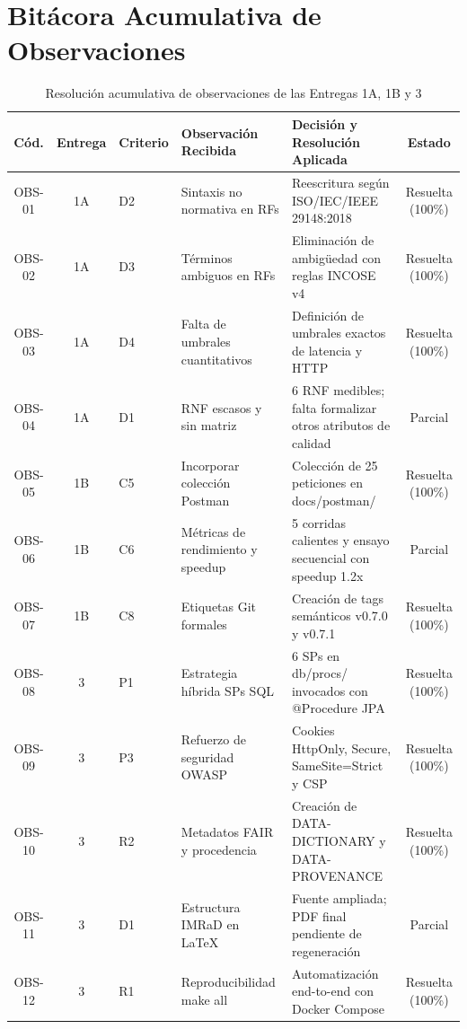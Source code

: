 \documentclass[11pt,a4paper]{report}
\begin{document}
\chapter{Bitácora Acumulativa de Observaciones}
\begin{table}[htbp]
\centering
\caption{Resolución acumulativa de observaciones de las Entregas 1A, 1B y 3}
\label{tab:anexo_observaciones}
\tiny
\begin{tabularx}{\textwidth}{ccllXc}
\toprule
\textbf{Cód.} & \textbf{Entrega} & \textbf{Criterio} & \textbf{Observación Recibida} & \textbf{Decisión y Resolución Aplicada} & \textbf{Estado} \\
\midrule
OBS-01 & 1A & D2 & Sintaxis no normativa en RFs & Reescritura según ISO/IEC/IEEE 29148:2018 & Resuelta (100\%) \\
OBS-02 & 1A & D3 & Términos ambiguos en RFs & Eliminación de ambigüedad con reglas INCOSE v4 & Resuelta (100\%) \\
OBS-03 & 1A & D4 & Falta de umbrales cuantitativos & Definición de umbrales exactos de latencia y HTTP & Resuelta (100\%) \\
OBS-04 & 1A & D1 & RNF escasos y sin matriz & 6 RNF medibles; falta formalizar otros atributos de calidad & Parcial \\
OBS-05 & 1B & C5 & Incorporar colección Postman & Colección de 25 peticiones en docs/postman/ & Resuelta (100\%) \\
OBS-06 & 1B & C6 & Métricas de rendimiento y speedup & 5 corridas calientes y ensayo secuencial con speedup 1.2x & Parcial \\
OBS-07 & 1B & C8 & Etiquetas Git formales & Creación de tags semánticos v0.7.0 y v0.7.1 & Resuelta (100\%) \\
OBS-08 & 3 & P1 & Estrategia híbrida SPs SQL & 6 SPs en db/procs/ invocados con @Procedure JPA & Resuelta (100\%) \\
OBS-09 & 3 & P3 & Refuerzo de seguridad OWASP & Cookies HttpOnly, Secure, SameSite=Strict y CSP & Resuelta (100\%) \\
OBS-10 & 3 & R2 & Metadatos FAIR y procedencia & Creación de DATA-DICTIONARY y DATA-PROVENANCE & Resuelta (100\%) \\
OBS-11 & 3 & D1 & Estructura IMRaD en LaTeX & Fuente ampliada; PDF final pendiente de regeneración & Parcial \\
OBS-12 & 3 & R1 & Reproducibilidad make all & Automatización end-to-end con Docker Compose & Resuelta (100\%) \\
\bottomrule
\end{tabularx}
\end{table}
\end{document}
